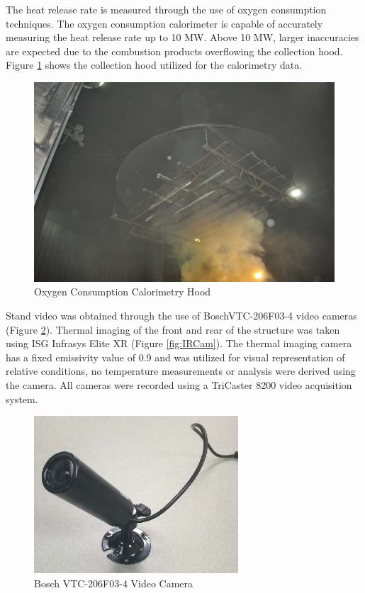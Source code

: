 \documentclass{article}
\begin{document}
The heat release rate is measured through the use of oxygen consumption techniques. The oxygen consumption calorimeter is capable of accurately measuring the heat release rate up to 10 MW. Above 10 MW, larger inaccuracies are expected due to the combustion products overflowing the collection hood. Figure \ref{fig:Hood} shows the collection hood utilized for the calorimetry data.

\begin{figure} [H]
	\centering
	\includegraphics[width = 5in]{0_Images/Instrumentation/Calorimetry_hood.jpg}
	\caption{Oxygen Consumption Calorimetry Hood}
	\label{fig:Hood}
\end{figure}

Stand video was obtained through the use of BoschVTC-206F03-4 video cameras (Figure \ref{fig:BullettCam}). Thermal imaging of the front and rear of the structure was taken using ISG Infrasys Elite XR (Figure \ref{fig:IRCam}). The thermal imaging camera has a fixed emissivity value of 0.9 and was utilized for visual representation of relative conditions, no temperature measurements or analysis were derived using the camera. All cameras were recorded using a TriCaster 8200 video acquisition system.

\begin{figure} [H]
	\centering
	\includegraphics[width = 3in]{0_Images/Instrumentation/BullettCam.jpg}
	\caption{Bosch VTC-206F03-4 Video Camera}
	\label{fig:BullettCam}
\end{figure}
\end{document}
